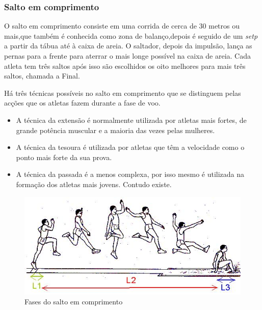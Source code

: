 \documentclass{report}
\begin{document}
            \subsubsection{Salto em comprimento}
            O salto em comprimento consiste em uma corrida de cerca de 30 metros ou mais,que também é conhecida como zona de balanço,depois é seguido de um \textit{setp} a partir da tábua até à caixa de areia. O saltador, depois da impulsão, lança as pernas para a frente para aterrar o mais longe possível na caixa de areia. Cada atleta tem três saltos após isso são escolhidos os oito melhores para mais três saltos, chamada a Final. \par
            Há três técnicas possíveis no salto em comprimento que se distinguem pelas
            acções que os atletas fazem durante a fase de voo.
            \begin{itemize}
                \item A técnica da extensão é normalmente utilizada por atletas mais fortes, de grande potência muscular e a maioria das vezes pelas mulheres. 
                \item A técnica da tesoura é utilizada por atletas que têm a velocidade como o ponto mais forte da sua prova.
                \item A técnica da passada é a menos complexa, por isso mesmo é utilizada na formação dos atletas mais jovens. Contudo existe.
            \end{itemize}
            
            \FloatBarrier
            \begin{figure}[h]
            \center
            \includegraphics[scale=.45,angle=0]{saltocomprimento.JPG}
            \caption{Fases do salto em comprimento}
            \label{fig:saltocomprimento.2}
            \end{figure}
            \FloatBarrier
            
            
\end{document}
